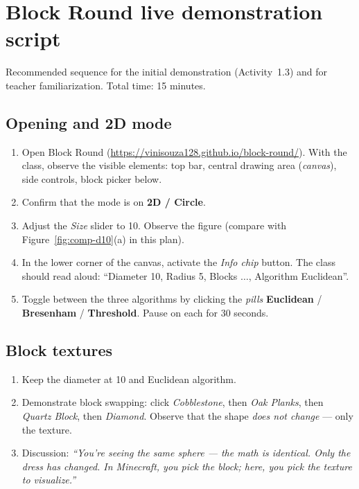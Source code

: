 \documentclass[12pt,a4paper]{scrartcl}
\newcommand{\acc}[1]{\textcolor{accent}{\textbf{#1}}}
\begin{document}
\newpage
\appendix
\renewcommand{\thesection}{\Alph{section}}
\setcounter{section}{0}

\section{Block Round live demonstration script}\label{ap:roteiro}

Recommended sequence for the initial demonstration (Activity~1.3) and for teacher familiarization. Total time: 15 minutes.

\subsection{Opening and 2D mode}
\begin{enumerate}[leftmargin=1.5em,itemsep=0.15em,topsep=0.3em]
  \item Open Block Round (\url{https://vinisouza128.github.io/block-round/}). With the class, observe the visible elements: top bar, central drawing area (\emph{canvas}), side controls, block picker below.
  \item Confirm that the mode is on \acc{2D / Circle}.
  \item Adjust the \emph{Size} slider to 10. Observe the figure (compare with Figure~\ref{fig:comp-d10}(a) in this plan).
  \item In the lower corner of the canvas, activate the \emph{Info chip} button. The class should read aloud: \enquote{Diameter 10, Radius 5, Blocks $\dots$, Algorithm Euclidean}.
  \item Toggle between the three algorithms by clicking the \emph{pills} \acc{Euclidean} / \acc{Bresenham} / \acc{Threshold}. Pause on each for 30 seconds.
\end{enumerate}

\subsection{Block textures}

\begin{enumerate}[leftmargin=1.5em,itemsep=0.15em,topsep=0.3em]
  \item Keep the diameter at 10 and Euclidean algorithm.
  \item Demonstrate block swapping: click \emph{Cobblestone}, then \emph{Oak Planks}, then \emph{Quartz Block}, then \emph{Diamond}. Observe that the shape \emph{does not change} --- only the texture.
  \item Discussion: \emph{\enquote{You're seeing the same sphere --- the math is identical. Only the dress has changed. In Minecraft, you pick the block; here, you pick the texture to visualize.}}
\end{enumerate}
\end{document}
